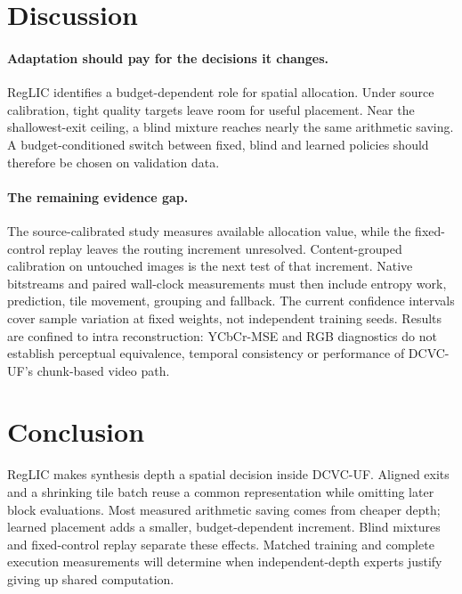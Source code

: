 \section{Discussion}

\paragraph{Adaptation should pay for the decisions it changes.}
RegLIC identifies a budget-dependent role for spatial allocation.
Under source calibration, tight quality targets leave room for useful
placement. Near the shallowest-exit ceiling, a blind mixture reaches
nearly the same arithmetic saving. A budget-conditioned switch between fixed, blind and learned policies
should therefore be chosen on validation data.

\paragraph{The remaining evidence gap.}
The source-calibrated study measures available allocation value, while
the fixed-control replay leaves the routing increment unresolved.
Content-grouped calibration on untouched images is the next test of that
increment. Native bitstreams and paired wall-clock measurements must then
include entropy work, prediction, tile movement, grouping and fallback.
The current confidence intervals cover sample variation at fixed weights,
not independent training seeds. Results are confined to intra reconstruction:
YCbCr-MSE and RGB diagnostics do not establish perceptual equivalence,
temporal consistency or performance of DCVC-UF's chunk-based video path.

\section{Conclusion}
RegLIC makes synthesis depth a spatial decision inside DCVC-UF.
Aligned exits and a shrinking tile batch reuse a common representation
while omitting later block evaluations. Most measured arithmetic saving
comes from cheaper depth; learned placement adds a smaller,
budget-dependent increment. Blind mixtures and fixed-control replay
separate these effects. Matched training and complete execution measurements
will determine when independent-depth experts justify giving up shared
computation.
